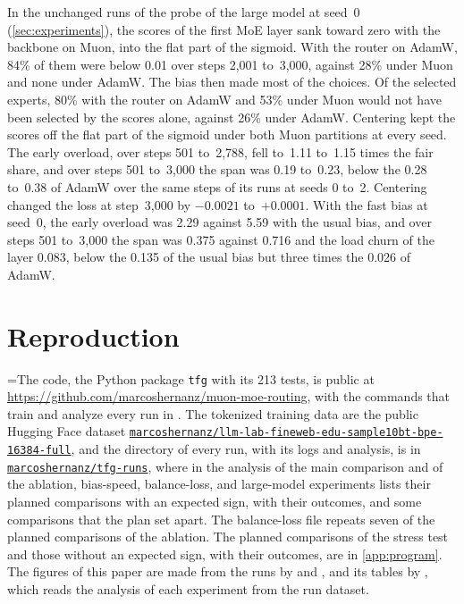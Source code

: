 \documentclass[11pt, a4paper]{article}
\begin{document}
In the unchanged runs of the probe of the large model at seed~0 (\cref{sec:experiments}), the scores of the first MoE layer sank toward zero with the backbone on Muon, into the flat part of the sigmoid. With the router on AdamW, 84\% of them were below 0.01 over steps 2,001 to~3,000, against 28\% under Muon and none under AdamW\@. The bias then made most of the choices. Of the selected experts, 80\% with the router on AdamW and 53\% under Muon would not have been selected by the scores alone, against 26\% under AdamW\@. Centering kept the scores off the flat part of the sigmoid under both Muon partitions at every seed. The early overload, over steps 501 to~2,788, fell to~1.11 to~1.15 times the fair share, and over steps 501 to~3,000 the span was 0.19 to~0.23, below the 0.28 to~0.38 of AdamW over the same steps of its runs at seeds 0 to~2. Centering changed the loss at step~3,000 by $-0.0021$ to~$+0.0001$. With the fast bias at seed~0, the early overload was 2.29 against 5.59 with the usual bias, and over steps 501 to~3,000 the span was 0.375 against 0.716 and the load churn of the layer 0.083, below the 0.135 of the usual bias but three times the 0.026 of AdamW\@.

\section{Reproduction}
\label{app:reproduction}

{\setlength{\rightskip}{0pt plus 5em}\spaceskip=\font\relax The code, the Python package \texttt{tfg} with its 213 tests, is public at \url{https://github.com/marcoshernanz/muon-moe-routing}, with the commands that train and analyze every run in . The tokenized training data are the public Hugging Face dataset \href{https://huggingface.co/datasets/marcoshernanz/llm-lab-fineweb-edu-sample10bt-bpe-16384-full}{\nolinkurl{marcoshernanz/llm-lab-fineweb-edu-sample10bt-bpe-16384-full}}, and the directory of every run, with its logs and analysis, is in \href{https://huggingface.co/datasets/marcoshernanz/tfg-runs}{\nolinkurl{marcoshernanz/tfg-runs}}, where  in the analysis of the main comparison and of the ablation, bias-speed, balance-loss, and large-model experiments lists their planned comparisons with an expected sign, with their outcomes, and some comparisons that the plan set apart. The balance-loss file repeats seven of the planned comparisons of the ablation. The planned comparisons of the stress test and those without an expected sign, with their outcomes, are in \cref{app:program}. The figures of this paper are made from the runs by  and , and its tables by , which reads the analysis of each experiment from the run dataset.\par}
\end{document}
